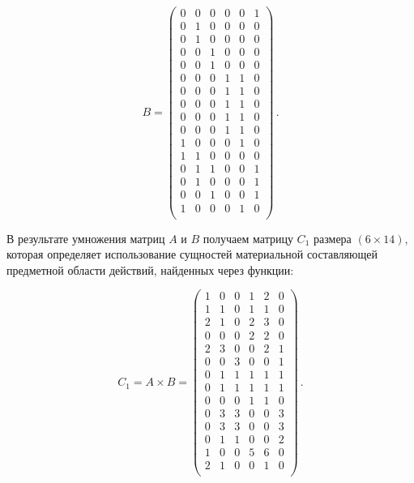 \begin{equation}
    B = \begin{pmatrix}
        0 & 0 & 0 & 0 & 0 & 1 \\
        0 & 1 & 0 & 0 & 0 & 0 \\
        0 & 1 & 0 & 0 & 0 & 0 \\
        0 & 0 & 1 & 0 & 0 & 0 \\
        0 & 0 & 1 & 0 & 0 & 0 \\
        0 & 0 & 0 & 1 & 1 & 0 \\
        0 & 0 & 0 & 1 & 1 & 0 \\
        0 & 0 & 0 & 1 & 1 & 0 \\
        0 & 0 & 0 & 1 & 1 & 0 \\
        0 & 0 & 0 & 1 & 1 & 0 \\
        1 & 0 & 0 & 0 & 1 & 0 \\
        1 & 1 & 0 & 0 & 0 & 0 \\
        0 & 1 & 1 & 0 & 0 & 1 \\
        0 & 1 & 0 & 0 & 0 & 1 \\
        0 & 0 & 1 & 0 & 0 & 1 \\
        1 & 0 & 0 & 0 & 1 & 0 \\
    \end{pmatrix}\,.
\end{equation}

В результате умножения матриц $A$ и $B$ получаем матрицу $C_1$ размера $(6\times14)$,
которая определяет использование сущностей материальной составляющей предметной области действий, найденных через функции:

\begin{equation}
    C_1 = A \times B = \begin{pmatrix}
        1 & 0 & 0 & 1 & 2 & 0 \\
        1 & 1 & 0 & 1 & 1 & 0 \\
        2 & 1 & 0 & 2 & 3 & 0 \\
        0 & 0 & 0 & 2 & 2 & 0 \\
        2 & 3 & 0 & 0 & 2 & 1 \\
        0 & 0 & 3 & 0 & 0 & 1 \\
        0 & 1 & 1 & 1 & 1 & 1 \\
        0 & 1 & 1 & 1 & 1 & 1 \\
        0 & 0 & 0 & 1 & 1 & 0 \\
        0 & 3 & 3 & 0 & 0 & 3 \\
        0 & 3 & 3 & 0 & 0 & 3 \\
        0 & 1 & 1 & 0 & 0 & 2 \\
        1 & 0 & 0 & 5 & 6 & 0 \\
        2 & 1 & 0 & 0 & 1 & 0 \\
    \end{pmatrix}\,.
\end{equation}

